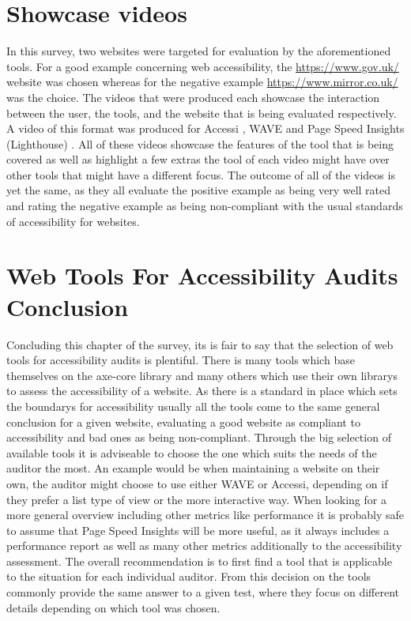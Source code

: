 \section{Showcase videos}

In this survey, two websites were targeted for evaluation by the
aforementioned tools. For a good example concerning web accessibility,
the \url{https://www.gov.uk/} website was chosen whereas for the
negative example \url{https://www.mirror.co.uk/} was the choice. The
videos that were produced each showcase the interaction between the
user, the tools, and the website that is being evaluated
respectively. A video of this format was produced for Accessi
\parencite{Accessi_vid}, WAVE \parencite{WAVE_vid} and Page Speed
Insights (Lighthouse) \parencite{PageSpeedInsights_vid}. All of these
videos showcase the features of the tool that is being covered as well
as highlight a few extras the tool of each video might have over other
tools that might have a different focus. The outcome of all of the
videos is yet the same, as they all evaluate the positive example as
being very well rated and rating the negative example as being
non-compliant with the usual standards of accessibility for websites.



\section{Web Tools For Accessibility Audits Conclusion}

Concluding this chapter of the survey, its is fair to say that the
selection of web tools for accessibility audits is plentiful. There is
many tools which base themselves on the axe-core library and many
others which use their own librarys to assess the accessibility of a
website. As there is a standard in place which sets the boundarys for
accessibility usually all the tools come to the same general
conclusion for a given website, evaluating a good website as compliant
to accessibility and bad ones as being non-compliant. Through the big
selection of available tools it is adviseable to choose the one which
suits the needs of the auditor the most. An example would be when
maintaining a website on their own, the auditor might choose to use
either WAVE or Accessi, depending on if they prefer a list type of
view or the more interactive way. When looking for a more general
overview including other metrics like performance it is probably safe
to assume that Page Speed Insights will be more useful, as it always
includes a performance report as well as many other metrics
additionally to the accessibility assessment. The overall
recommendation is to first find a tool that is applicable to the
situation for each individual auditor. From this decision on the tools
commonly provide the same answer to a given test, where they focus on
different details depending on which tool was chosen.


